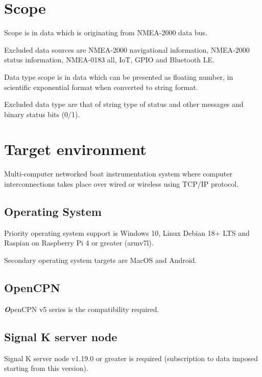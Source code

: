 \documentclass[11pt]{article}
\begin{document}
    \hypertarget{scope}{%
\section{Scope}\label{scope}}

    Scope is in data which is originating from NMEA-2000 data bus.

Excluded data sources are NMEA-2000 navigational information, NMEA-2000
status information, NMEA-0183 all, IoT, GPIO and Bluetooth LE.

Data type scope is in data which can be presented as floating number, in
scientific exponential format when converted to string format.

Excluded data type are that of string type of status and other messages
and binary status bits (0/1).

    \hypertarget{target-environment}{%
\section{Target environment}\label{target-environment}}

    Multi-computer networked boat instrumentation system where computer
interconnections takes place over wired or wireless using TCP/IP
protocol.

    \hypertarget{operating-system}{%
\subsection{Operating System}\label{operating-system}}

    Priority operating system support is Windows 10, Linux Debian 18+ LTS
and Raspian on Raspberry Pi 4 or greater (armv7l).

    Secondary operating system targets are MacOS and Android.

    \hypertarget{opencpn}{%
\subsection{OpenCPN}\label{opencpn}}

    \textbf{\emph{O}}penCPN v5 series is the compatibility required.

    \hypertarget{signal-k-server-node}{%
\subsection{Signal K server node}\label{signal-k-server-node}}

    Signal K server node v1.19.0 or greater is required (subscription to
data imposed starting from this version).
\end{document}
